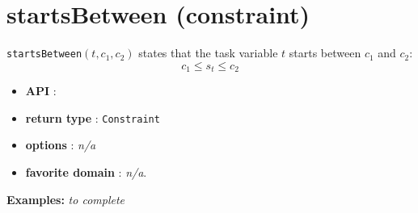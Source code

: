 \section{startsBetween (constraint)}\label{startsbetween:startsbetweenconstraint}\hypertarget{startsbetween:startsbetweenconstraint}{}
\begin{notedef}
  \texttt{startsBetween}$(t,c_1, c_2)$ states that the task variable $t$ starts between $c_1$ and $c_2$:
  $$c_1 \le s_t \le c_2$$
\end{notedef}

\begin{itemize}
	\item \textbf{API} :
	\item \textbf{return type} : \texttt{Constraint}
	\item \textbf{options} : \emph{n/a}
	\item \textbf{favorite domain} : \emph{n/a}.
\end{itemize}

\textbf{Examples:}
%
\emph{to complete}
